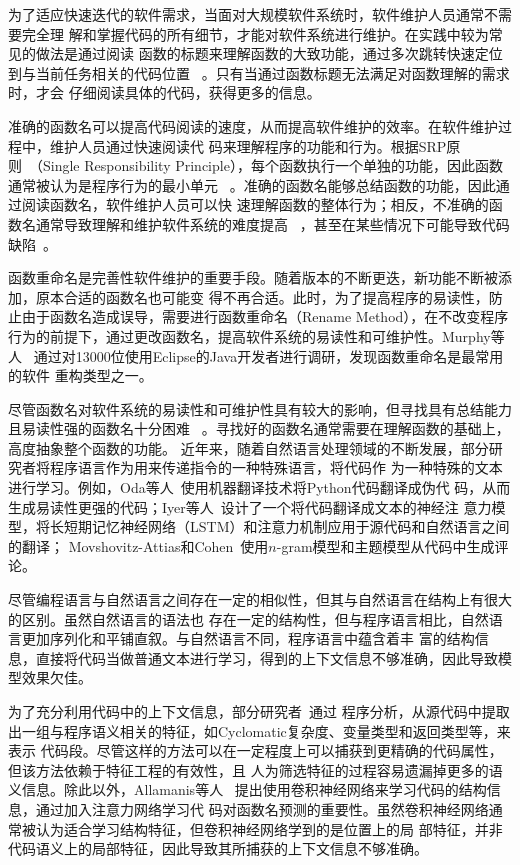 为了适应快速迭代的软件需求，当面对大规模软件系统时，软件维护人员通常不需要完全理
解和掌握代码的所有细节，才能对软件系统进行维护。在实践中较为常见的做法是通过阅读
函数的标题来理解函数的大致功能，通过多次跳转快速定位到与当前任务相关的代码位置
~\cite{starke2009searching}。只有当通过函数标题无法满足对函数理解的需求时，才会
仔细阅读具体的代码，获得更多的信息。

准确的函数名可以提高代码阅读的速度，从而提高软件维护的效率。在软件维护过程中，维护人员通过快速阅读代
码来理解程序的功能和行为。根据SRP原则~\cite{martin2003agile}（Single Responsibility
Principle），每个函数执行一个单独的功能，因此函数通常被认为是程序行为的最小单元
~\cite{host2009debugging}。准确的函数名能够总结函数的功能，因此通过阅读函数名，软件维护人员可以快
速理解函数的整体行为；相反，不准确的函数名通常导致理解和维护软件系统的难度提高
~\cite{arnaoudova2016linguistic}，甚至在某些情况下可能导致代码缺陷~\cite{abebe2012can}。

函数重命名是完善性软件维护的重要手段。随着版本的不断更迭，新功能不断被添加，原本合适的函数名也可能变
得不再合适。此时，为了提高程序的易读性，防止由于函数名造成误导，需要进行函数重命名（Rename
Method），在不改变程序行为的前提下，通过更改函数名，提高软件系统的易读性和可维护性。Murphy等人
~\cite{Murphy-Hill:ICSE09}通过对13000位使用Eclipse的Java开发者进行调研，发现函数重命名是最常用的软件
重构类型之一。

尽管函数名对软件系统的易读性和可维护性具有较大的影响，但寻找具有总结能力且易读性强的函数名十分困难
~\cite{allamanis2015suggesting}。寻找好的函数名通常需要在理解函数的基础上，高度抽象整个函数的功能。
近年来，随着自然语言处理领域的不断发展，部分研究者将程序语言作为用来传递指令的一种特殊语言，将代码作
为一种特殊的文本进行学习。例如，Oda等人~\cite{oda2015learning}使用机器翻译技术将Python代码翻译成伪代
码，从而生成易读性更强的代码；Iyer等人~\cite{iyer2016summarizing}设计了一个将代码翻译成文本的神经注
意力模型，将长短期记忆神经网络（LSTM）和注意力机制应用于源代码和自然语言之间的翻译；
Movshovitz-Attias和Cohen~\cite{movshovitz2013natural}使用$n$-gram模型和主题模型从代码中生成评论。

尽管编程语言与自然语言之间存在一定的相似性，但其与自然语言在结构上有很大的区别。虽然自然语言的语法也
存在一定的结构性，但与程序语言相比，自然语言更加序列化和平铺直叙。与自然语言不同，程序语言中蕴含着丰
富的结构信息，直接将代码当做普通文本进行学习，得到的上下文信息不够准确，因此导致模型效果欠佳。

为了充分利用代码中的上下文信息，部分研究者~\cite{allamanis2015suggesting, haiduc2010supporting}通过
程序分析，从源代码中提取出一组与程序语义相关的特征，如Cyclomatic复杂度、变量类型和返回类型等，来表示
代码段。尽管这样的方法可以在一定程度上可以捕获到更精确的代码属性，但该方法依赖于特征工程的有效性，且
人为筛选特征的过程容易遗漏掉更多的语义信息。除此以外，Allamanis等人
~\cite{allamanis2016convolutional}提出使用卷积神经网络来学习代码的结构信息，通过加入注意力网络学习代
码对函数名预测的重要性。虽然卷积神经网络通常被认为适合学习结构特征，但卷积神经网络学到的是位置上的局
部特征，并非代码语义上的局部特征，因此导致其所捕获的上下文信息不够准确。

